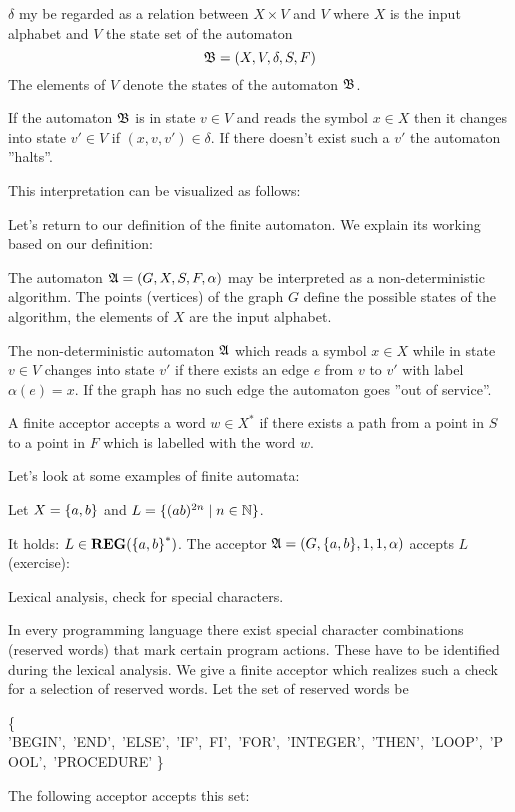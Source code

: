 $\delta$ my be regarded as a relation between $X \times V$ and $V$ where $X$ is
the input alphabet and $V$ the state set of the automaton \[ \mbox{$\mathfrak{B}$} = (X,
V, \delta, S, F) \]
The elements of $V$ denote the states of the automaton $\mbox{$\mathfrak{B}$}$.

If the automaton $\mbox{$\mathfrak{B}$}$ is in state $v \in V$ and reads the symbol $x
\in X$ then it changes into state $v' \in V$ if $(x, v, v') \in \delta$. If
there doesn't exist such a $v'$ the automaton ''halts''.

This interpretation can be visualized as follows:

\missingfigure

Let's return to our definition of the finite automaton. We explain its working
based on our definition:

The automaton $\mbox{$\mathfrak{A}$} = (G, X, S, F, \alpha)$ may be interpreted as a
non-deterministic algorithm. The points (vertices) of the graph $G$ define the
possible states of the algorithm, the elements of $X$ are the input alphabet.

The non-deterministic automaton $\mbox{$\mathfrak{A}$}$ which reads a symbol $x \in X$
while in state $v \in V$ changes into state $v'$ if there exists an edge $e$
from $v$ to $v'$ with label $\alpha(e) = x$. If the graph has no such edge the
automaton goes ''out of service''.

A finite acceptor accepts a word $w \in X^*$ if there exists a path from a point
in $S$ to a point in $F$ which is labelled with the word $w$.

Let's look at some examples of finite automata:
\begin{example}
Let $X = \mbox{$\{a, b\}$}$ and $L = \mbox{$\{(a b)^{2n} \mid n \in
\mathbb{N}\}$}$.

It holds: $L \in \mbox{{\bf REG}}(\mbox{$\{a, b\}$}^*)$. The acceptor $\mbox{$\mathfrak{A}$} = (G, \mbox{$\{a,
b\}$}, {1}, {1}, \alpha)$ accepts $L$ (exercise):
\begin{center}

\end{center}
\end{example}

\bigskip
\begin{example}
Lexical analysis, check for special characters.

In every programming language there exist special character combinations
(reserved words) that mark certain program actions. These have to be identified
during the lexical analysis. We give a finite acceptor which realizes such a 
check for a selection of reserved words. Let the set of reserved words be
 
\{ 'BEGIN',\ 'END',\ 'ELSE',\ 'IF',\ FI',\ 'FOR',\ 'INTEGER',\ 'THEN',\
'LOOP',\ 'POOL',\ 'PROCEDURE' \}

The following acceptor accepts this set:

\begin{minipage}{\textwidth}
\begin{sideways}

\end{sideways}
\end{minipage}
\end{example}

